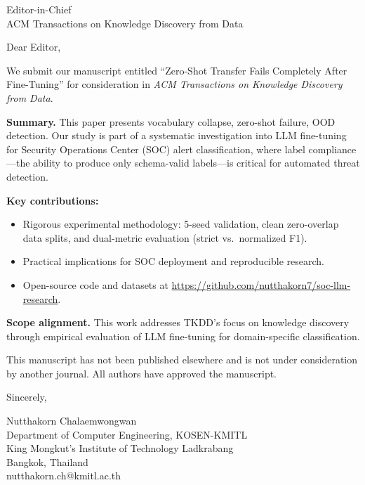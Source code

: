 \documentclass[11pt]{letter}
\begin{document}
\begin{letter}{Editor-in-Chief \\ ACM Transactions on Knowledge Discovery from Data}

\opening{Dear Editor,}

We submit our manuscript entitled ``Zero-Shot Transfer Fails Completely After Fine-Tuning'' for consideration in \textit{ACM Transactions on Knowledge Discovery from Data}.

\textbf{Summary.} This paper presents vocabulary collapse, zero-shot failure, OOD detection. Our study is part of a systematic investigation into LLM fine-tuning for Security Operations Center (SOC) alert classification, where label compliance---the ability to produce only schema-valid labels---is critical for automated threat detection.

\textbf{Key contributions:}
\begin{itemize}
\item Rigorous experimental methodology: 5-seed validation, clean zero-overlap data splits, and dual-metric evaluation (strict vs.\ normalized F1).
\item Practical implications for SOC deployment and reproducible research.
\item Open-source code and datasets at \url{https://github.com/nutthakorn7/soc-llm-research}.
\end{itemize}

\textbf{Scope alignment.} This work addresses TKDD's focus on knowledge discovery through empirical evaluation of LLM fine-tuning for domain-specific classification.

This manuscript has not been published elsewhere and is not under consideration by another journal. All authors have approved the manuscript.

\closing{Sincerely,}

Nutthakorn Chalaemwongwan \\
Department of Computer Engineering, KOSEN-KMITL \\
King Mongkut's Institute of Technology Ladkrabang \\
Bangkok, Thailand \\
nutthakorn.ch@kmitl.ac.th

\end{letter}
\end{document}
